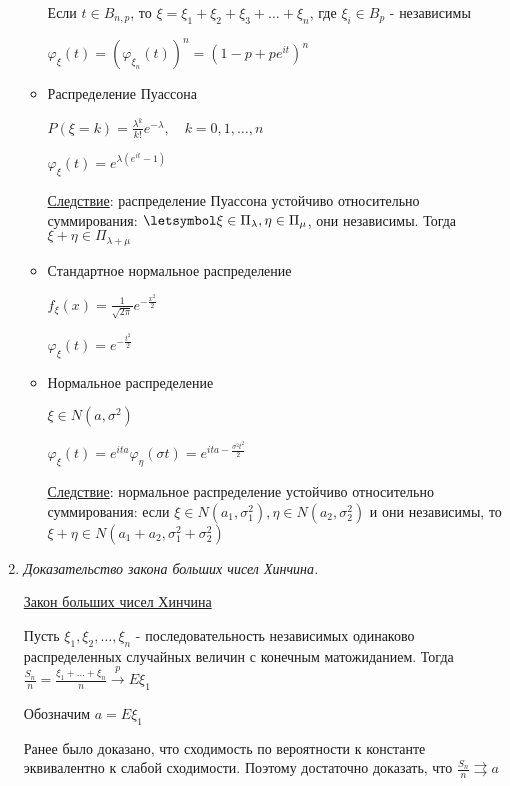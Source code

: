 \begin{enumerate}
\begin{itemize}
        Если $t \in B_{n,p}$, то $\xi = \xi_1 + \xi_2 + \xi_3 + \dots + \xi_n$, где $\xi_i \in B_p$ - независимы

        $\varphi_\xi(t) = (\varphi_{\xi_n}(t))^n = (1 - p + p e^{it})^n$

        \item Распределение Пуассона

        $P(\xi = k) = \frac{\lambda^k}{k!} e^{-\lambda}, \quad k = 0, 1, \dots, n$

        $\varphi_\xi(t) = e^{\lambda (e^{it} - 1)}$

        \underline{Следствие}: распределение Пуассона устойчиво относительно суммирования: $\letsymbol \xi \in \Pi_\lambda, \eta \in \Pi_\mu$, они независимы. Тогда $\xi + \eta \in \Pi_{\lambda + \mu}$

        \item Стандартное нормальное распределение

        $f_\xi(x) = \frac{1}{\sqrt{2\pi}} e^{-\frac{x^2}{2}}$

        $\varphi_\xi(t) = e^{-\frac{t^2}{2}}$

        \item Нормальное распределение

        $\xi \in N(a, \sigma^2)$

        $\varphi_\xi(t) = e^{ita} \varphi_\eta(\sigma t) = e^{ita - \frac{\sigma^2t^2}{2}}$

        \underline{Следствие}: нормальное распределение устойчиво относительно суммирования: если $\xi \in N(a_1, \sigma_1^2), \eta \in N(a_2, \sigma^2_2)$ и они независимы, то $\xi + \eta \in N(a_1 + a_2, \sigma_1^2 + \sigma_2^2)$

    \end{itemize}

    \item \textit{Доказательство закона больших чисел Хинчина.}

    \hyperlink{lawofbignumberskhinchin2}{Закон больших чисел Хинчина}
    
    Пусть $\xi_1, \xi_2, \dots, \xi_n$ - последовательность независимых одинаково распределенных случайных величин с конечным матожиданием.
    Тогда $\frac{S_n}{n} = \frac{\xi_1 + \dots + \xi_n}{n} \overset{p}{\longrightarrow} E\xi_1$
    
    \begin{MyProof}
        Обозначим $a = E\xi_1$
    
        Ранее было доказано, что сходимость по вероятности к константе эквивалентно к слабой сходимости. Поэтому достаточно доказать, что $\frac{S_n}{n} \rightrightarrows a$
    

\end{MyProof}
\end{enumerate}
